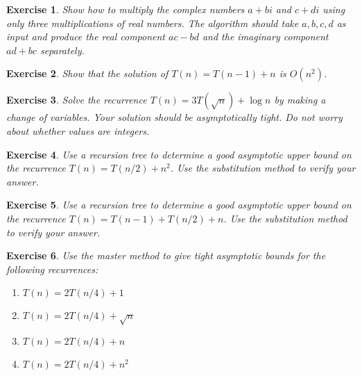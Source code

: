 \documentclass[11pt]{amsart}
\theoremstyle{theorem}
\newtheorem{exercise}{Exercise}
\begin{document}
\begin{exercise}
Show how to multiply the complex numbers $a+bi$ and $c+di$ using only three multiplications of real numbers. The algorithm should take $a,b,c,d$ as input and produce the real component $ac-bd$ and the imaginary component $ad+bc$ separately.
\end{exercise}

\begin{exercise}
Show that the solution of $T(n)=T(n-1)+n$ is $O(n^2)$.
\end{exercise}

\begin{exercise}
Solve the recurrence $T(n)=3T(\sqrt{n})+\log n$ by making a change of variables. Your solution should be asymptotically tight. Do not worry about whether values are integers.
\end{exercise}

\begin{exercise}
Use a recursion tree to determine a good asymptotic upper bound on the recurrence $T(n)=T(n/2)+n^2$. Use the substitution method to verify your answer.
\end{exercise}

\begin{exercise}
Use a recursion tree to determine a good asymptotic upper bound on the recurrence $T(n)=T(n-1)+T(n/2)+n$. Use the substitution method to verify your answer.
\end{exercise}

\begin{exercise}
Use the master method to give tight asymptotic bounds for the following recurrences:
\begin{enumerate}
\item $T(n)=2T(n/4)+1$
\item $T(n)=2T(n/4)+\sqrt{n}$
\item $T(n)=2T(n/4)+n$
\item $T(n)=2T(n/4)+n^2$
\end{enumerate}
\end{exercise}
\end{document}
